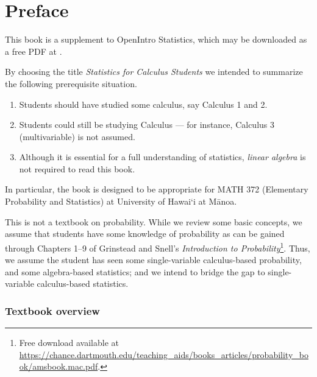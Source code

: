 \chapter*{Preface}

This book is a supplement to OpenIntro Statistics, which may be downloaded as a free PDF at . \vspace{3mm}


\noindent By choosing the title \emph{Statistics for Calculus Students} we intended to summarize the following prerequisite situation.\vspace{-1mm}
\begin{enumerate}
\setlength{\itemsep}{0mm}
\item[(1)] Students should have studied some calculus, say Calculus 1 and 2.
\item[(2)] Students could still be studying Calculus --- for instance, Calculus 3 (multivariable) is not assumed.
\item[(3)] Although it is essential for a full understanding of statistics, \emph{linear algebra} is not required to read this book.
\end{enumerate}
In particular, the book is designed to be appropriate for MATH 372 (Elementary Probability and Statistics) at University of Hawai\textquoteleft i at M\=anoa.

\noindent This is not a textbook on probability. While we review some basic concepts, we assume that students have some knowledge of probability as can be gained through Chapters 1--9 of Grinstead and Snell's \emph{Introduction to Probability}\footnote{Free download available at \url{https://chance.dartmouth.edu/teaching_aids/books_articles/probability_book/amsbook.mac.pdf}.}.
Thus, we assume the student has seen some single-variable calculus-based probability, and some algebra-based statistics; and we intend to bridge the gap to single-variable calculus-based statistics.

\subsection*{Textbook overview}


